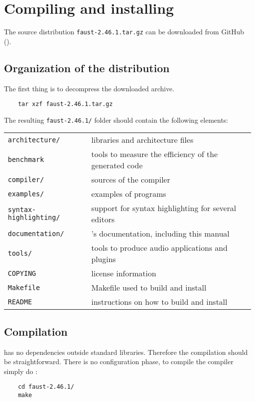 \chapter{Compiling and installing \faust}
\label{install}


The \faust source distribution \lstinline'faust-2.46.1.tar.gz' can be downloaded from GitHub ().

\section{Organization of the distribution}
The first thing is to decompress the downloaded archive. 
\begin{lstlisting}
	tar xzf faust-2.46.1.tar.gz
\end{lstlisting}

The resulting \lstinline'faust-2.46.1/' folder should contain the following elements:

\begin{tabular}{ll}
	\lstinline'architecture/' 		&\faust libraries and architecture files\\
	\lstinline'benchmark'			&tools to measure the efficiency of the generated code\\
	\lstinline'compiler/'			&sources of the \faust compiler\\
	\lstinline'examples/'			&examples of \faust programs\\
	\lstinline'syntax-highlighting/'&	support for syntax highlighting for several editors\\
	\lstinline'documentation/' 		&\faust's documentation, including this manual\\
	\lstinline'tools/'				&tools to produce audio applications and plugins\\
	\lstinline'COPYING'			&license information\\
	\lstinline'Makefile'			&Makefile used to build and install \faust\\
	\lstinline'README'			&instructions on how to build and install \faust
\end{tabular}

\section{Compilation}
\faust has no dependencies outside standard libraries. Therefore the compilation should be straightforward. There is no configuration phase, to compile the \faust compiler simply do :
\begin{lstlisting}
	cd faust-2.46.1/
	make
\end{lstlisting}

